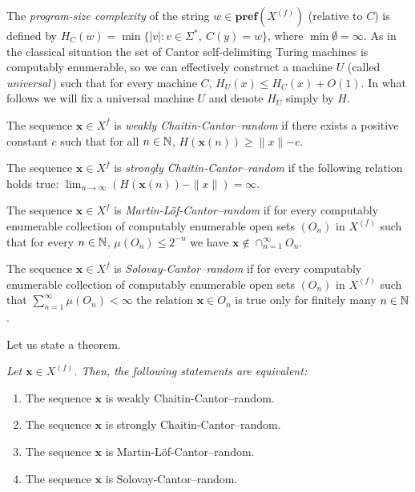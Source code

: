 \documentclass{elsart}
\begin{document}
The {\em program-size complexity} of the string
$w\in{{\mathbf{pref}({{X^{(f)}}})}}$ (relative to $C$)
is  defined by $H_C(w)=\min \{|v| :  v \in \Sigma^*, \ C(y)=w\}$,
where $\min \emptyset = \infty$. As in the classical situation
the set of Cantor self-delimiting Turing machines is computably enumerable,
so we can effectively construct  a  machine $U$ (called  {\em universal}\,)
such
that  for every  machine
$C$, $H_U (x) \leq H_C (x) + O(1)$.
In what follows we will fix a universal machine $U$ and denote $H_U$ simply
by $H$.



The sequence ${\mathbf x} \in X^{f}$ is {\it weakly Chaitin-Cantor--random} if there
exists
a positive constant $c$ such that for all $n\in \Bbb{N}$,  $H({\mathbf x}(n)) \ge
\parallel x \parallel -c$.


The sequence ${\mathbf x} \in X^{f}$ is {\it strongly Chaitin-Cantor--random} if the
following relation holds true:  $\lim_{n
\to \infty} (H({\mathbf x}(n)) - \parallel x \parallel) = \infty$.



The sequence ${\mathbf x} \in X^{f}$ is {\it Martin-L\" of-Cantor--random} if   for
every computably enumerable collection of computably enumerable open sets
$(O_n)$ in ${X^{(f)}}$ such that for every $n\in \Bbb{N}$,  $\mu (O_n)
\le 2^{-n}$ we have ${\mathbf x} \not\in \cap_{n=1}^{\infty} O_n$.


The sequence ${\mathbf x} \in X^{f}$ is {\it Solovay-Cantor--random} if   for every
computably enumerable collection of computably enumerable open sets $(O_n)$
in ${X^{(f)}}$ such that $\sum_{n=1}^{\infty}\mu (O_n) < \infty$ the relation  ${\mathbf x}
\in  O_n$ is true only for finitely many $n\in\Bbb{N}$.




Let us state a theorem.
{\it Let ${\mathbf x} \in{X^{(f)}}$. Then, the following statements are equivalent:
\begin{enumerate}
\item The sequence ${\mathbf x}$ is
weakly Chaitin-Cantor--random.
\item The sequence ${\mathbf x}$ is strongly Chaitin-Cantor--random.
\item The sequence ${\mathbf x}$ is
Martin-L\" of-Cantor--random.
\item The sequence ${\mathbf x}$ is Solovay-Cantor--random.
\end{enumerate}
}
\end{document}
